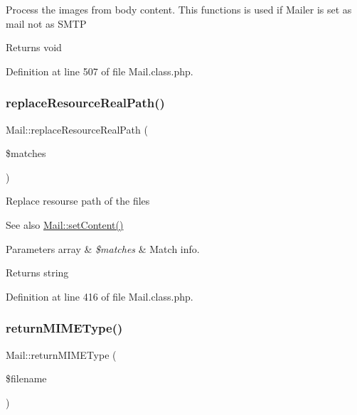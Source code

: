 Process the images from body content. This functions is used if Mailer is set as mail not as S\+M\+TP

\begin{DoxyReturn}{Returns}
void 
\end{DoxyReturn}


Definition at line 507 of file Mail.\+class.\+php.

\hypertarget{classMail_ae3182bb75fb675d2baceaf2c38dc7edd}{}\label{classMail_ae3182bb75fb675d2baceaf2c38dc7edd} 
\subsubsection{\texorpdfstring{replace\+Resource\+Real\+Path()}{replaceResourceRealPath()}}
{\footnotesize\ttfamily Mail\+::replace\+Resource\+Real\+Path (\begin{DoxyParamCaption}\item[{}]{\$matches }\end{DoxyParamCaption})}

Replace resourse path of the files

\begin{DoxySeeAlso}{See also}
\hyperlink{classMail_a2112ae431d2a140d8624b943cf0eace9}{Mail\+::set\+Content()} 
\end{DoxySeeAlso}

\begin{DoxyParams}[1]{Parameters}
array & {\em \$matches} & Match info. \\
\hline
\end{DoxyParams}
\begin{DoxyReturn}{Returns}
string 
\end{DoxyReturn}


Definition at line 416 of file Mail.\+class.\+php.

\hypertarget{classMail_afe036d54e43919318cb8e081533e7b90}{}\label{classMail_afe036d54e43919318cb8e081533e7b90} 
\subsubsection{\texorpdfstring{return\+M\+I\+M\+E\+Type()}{returnMIMEType()}}
{\footnotesize\ttfamily Mail\+::return\+M\+I\+M\+E\+Type (\begin{DoxyParamCaption}\item[{}]{\$filename }\end{DoxyParamCaption})}

